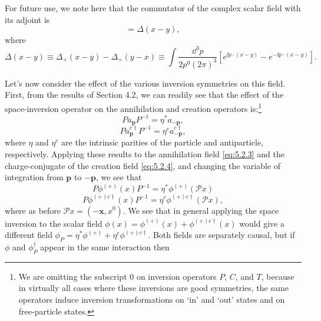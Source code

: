 For future use, we note here that the commutator of the complex scalar field
with its adjoint is
\begin{equation}
  [\phi(x),\phi^\dagger(y)]=\Delta(x-y),
  \tag{5.2.12}\label{eq:5.2.12}
\end{equation}
where
\begin{equation}
  \Delta(x-y)\equiv\Delta_+(x-y)-\Delta_+(y-x)
  \equiv\int\frac{\dd^3p}{2p^0(2\pi)^3}
  \left[e^{\ii p\cdot(x-y)}-e^{-\ii p\cdot(x-y)}\right].
  \tag{5.2.13}\label{eq:5.2.13}
\end{equation}

Let's now consider the effect of the various inversion symmetries on this
field. First, from the results of Section 4.2, we can readily see that the
effect of the space-inversion operator on the annihilation and creation
operators is:\footnote{We are omitting the subscript 0 on inversion operators
$P$, $C$, and $T$, because in virtually all cases where these inversions are
good symmetries, the same operators induce inversion transformations on `in'
and `out' states and on free-particle states.}
\begin{equation}
  P a_{\mathbf{p}}P^{-1}=\eta^*a_{-\mathbf{p}},
  \tag{5.2.14}\label{eq:5.2.14}
\end{equation}
\begin{equation}
  P a^{c\dagger}_{\mathbf{p}}P^{-1}=\eta^c a^{c\dagger}_{-\mathbf{p}},
  \tag{5.2.15}\label{eq:5.2.15}
\end{equation}
where $\eta$ and $\eta^c$ are the intrinsic parities of the particle and
antiparticle, respectively. Applying these results to the annihilation field
\eqref{eq:5.2.3} and the charge-conjugate of the creation field \eqref{eq:5.2.4}, and changing
the variable of integration from $\mathbf{p}$ to $-\mathbf{p}$, we see that
\begin{equation}
  P\phi^{(+)}(x)P^{-1}=\eta^*\phi^{(+)}(\mathcal{P}x)
  \tag{5.2.16}\label{eq:5.2.16}
\end{equation}
\begin{equation}
  P\phi^{(+)c\dagger}(x)P^{-1}
  =\eta^c\phi^{(+)c\dagger}(\mathcal{P}x),
  \tag{5.2.17}\label{eq:5.2.17}
\end{equation}
where as before $\mathcal{P}x=(-\mathbf{x},x^0)$. We see that in general
applying the space inversion to the scalar field
$\phi(x)=\phi^{(+)}(x)+\phi^{(+)c\dagger}(x)$ would give a different field
$\phi_P=\eta^*\phi^{(+)}+\eta^c\phi^{(+)c\dagger}$. Both fields are separately
causal, but if $\phi$ and $\phi_P^\dagger$ appear in the same interaction then
